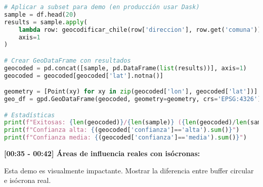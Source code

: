 \documentclass[11pt,a4paper]{article}
\begin{document}
\begin{lstlisting}[language=Python]
# Aplicar a subset para demo (en producción usar Dask)
sample = df.head(20)
results = sample.apply(
    lambda row: geocodificar_chile(row['direccion'], row.get('comuna')), 
    axis=1
)

# Crear GeoDataFrame con resultados
geocoded = pd.concat([sample, pd.DataFrame(list(results))], axis=1)
geocoded = geocoded[geocoded['lat'].notna()]

geometry = [Point(xy) for xy in zip(geocoded['lon'], geocoded['lat'])]
geo_df = gpd.GeoDataFrame(geocoded, geometry=geometry, crs='EPSG:4326')

# Estadísticas
print(f"Exitosas: {len(geocoded)}/{len(sample)} ({len(geocoded)/len(sample)*100:.1f}%)")
print(f"Confianza alta: {(geocoded['confianza']=='alta').sum()}")
print(f"Confianza media: {(geocoded['confianza']=='media').sum()}")
\end{lstlisting}

\textbf{[00:35 - 00:42] Áreas de influencia reales con isócronas:}

\begin{demobox}
Esta demo es visualmente impactante. Mostrar la diferencia entre buffer circular e isócrona real.
\end{demobox}
\end{document}
